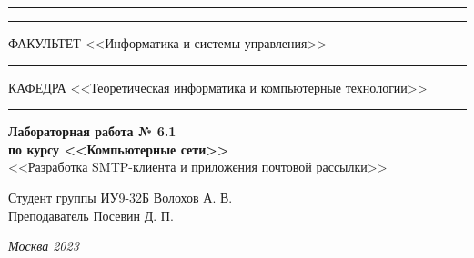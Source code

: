 \documentclass[a4paper, 14pt]{extarticle}
\begin{document}
\begin{titlepage}
\vspace{-25pt}
\hspace{-35pt}\rule{\textwidth}{2.3pt}

\vspace*{-20.3pt}
\hspace{-35pt}\rule{\textwidth}{0.4pt}

\vspace{1.5ex}
\hspace{-35pt} \noindent \small ФАКУЛЬТЕТ\hspace{80pt} <<Информатика и системы управления>>

\vspace*{-16pt}
\hspace{47pt}\rule{0.83\textwidth}{0.4pt}

\vspace{0.5ex}
\hspace{-35pt} \noindent \small КАФЕДРА\hspace{50pt} <<Теоретическая информатика и компьютерные технологии>>

\vspace*{-16pt}
\hspace{30pt}\rule{0.866\textwidth}{0.4pt}
  
\vspace{11em}

\begin{center}
\Large {\bf Лабораторная работа № 6.1} \\ 
\large {\bf по курсу <<Компьютерные сети>>} \\
\large <<Разработка SMTP-клиента и приложения почтовой рассылки>> 
\end{center}\normalsize

\vspace{8em}


\begin{flushright}
  {Студент группы ИУ9-32Б Волохов А. В. \hspace*{15pt}\\ 
  \vspace{2ex}
  Преподаватель Посевин Д. П.\hspace*{15pt}}
\end{flushright}

\bigskip

\vfill
 

\begin{center}
\textsl{Москва 2023}
\end{center}
\end{titlepage}
\end{document}
